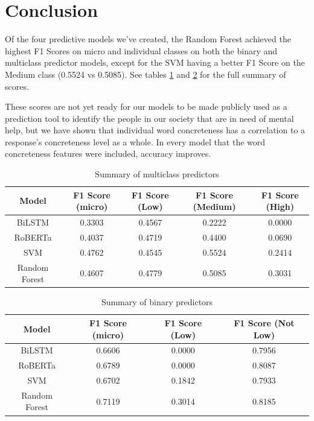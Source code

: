\documentclass[12pt, a4paper]{article}
\begin{document}
\clearpage

\section{Conclusion}

Of the four predictive models we've created, the Random Forest achieved the highest F1 Scores on micro and individual classes on both the binary and multiclass predictor models, except for the SVM having a better F1 Score on the Medium class (0.5524 vs 0.5085). See tables \ref{table:summary_multi} and \ref{table:summary_binary} for the full summary of scores.

These scores are not yet ready for our models to be made publicly used as a prediction tool to identify the people in our society that are in need of mental help, but we have shown that individual word concreteness has a correlation to a response's concreteness level as a whole. In every model that the word concreteness features were included, accuracy improves. 
 
\begin{table}[ht]
\centering
\begin{tabular}{||c c c c c||} 
 \hline
 Model & F1 Score (micro) & F1 Score (Low) & F1 Score (Medium) & F1 Score (High)  \\ [0.5ex] 
 \hline\hline
 BiLSTM & 0.3303 & 0.4567 & 0.2222 & 0.0000 \\ 
 RoBERTa & 0.4037 & 0.4719 & 0.4400  & 0.0690 \\
 SVM & 0.4762 & 0.4545  & 0.5524 & 0.2414\\
 Random Forest & 0.4607 & 0.4779 & 0.5085 & 0.3031 \\
 \hline
\end{tabular}

\caption{Summary of multiclass predictors}
\label{table:summary_multi}
\end{table}


\begin{table}[ht]
\centering
\begin{tabular}{||c c c c||} 
 \hline
 Model & F1 Score (micro) & F1 Score (Low) & F1 Score (Not Low) \\ [0.5ex] 
 \hline\hline
 BiLSTM & 0.6606 & 0.0000 & 0.7956 \\ 
 RoBERTa & 0.6789 & 0.0000 & 0.8087  \\
 SVM & 0.6702 & 0.1842  & 0.7933 \\
 Random Forest & 0.7119 & 0.3014 & 0.8185 \\
 \hline
\end{tabular}

\caption{Summary of binary predictors}
\label{table:summary_binary}
\end{table}
\end{document}
